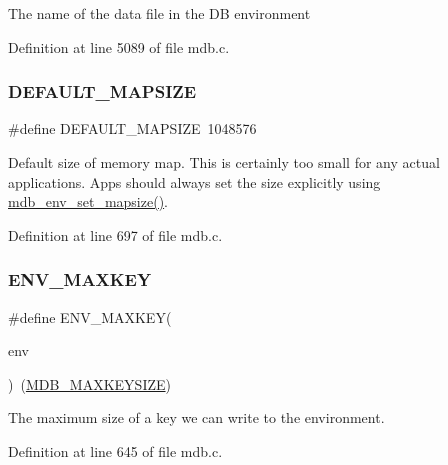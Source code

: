 The name of the data file in the DB environment 

Definition at line 5089 of file mdb.\+c.

\mbox{\label{group__internal_ga506f893519db205966f7988c03c920f5}} 
\subsubsection{\texorpdfstring{D\+E\+F\+A\+U\+L\+T\+\_\+\+M\+A\+P\+S\+I\+ZE}{DEFAULT\_MAPSIZE}}
{\footnotesize\ttfamily \#define D\+E\+F\+A\+U\+L\+T\+\_\+\+M\+A\+P\+S\+I\+ZE~1048576}

Default size of memory map. This is certainly too small for any actual applications. Apps should always set the size explicitly using \mbox{\hyperlink{group__internal_gab4fb586d631d0cfdd0a134b8c19f371b}{mdb\+\_\+env\+\_\+set\+\_\+mapsize()}}. 

Definition at line 697 of file mdb.\+c.

\mbox{\label{group__internal_ga81fe7e8b859d93e245ac73990bbeb90b}} 
\subsubsection{\texorpdfstring{E\+N\+V\+\_\+\+M\+A\+X\+K\+EY}{ENV\_MAXKEY}}
{\footnotesize\ttfamily \#define E\+N\+V\+\_\+\+M\+A\+X\+K\+EY(\begin{DoxyParamCaption}\item[{}]{env }\end{DoxyParamCaption})~(\mbox{\hyperlink{group__internal_gac929399f5d93cef85f874b9e9b1d09e0}{M\+D\+B\+\_\+\+M\+A\+X\+K\+E\+Y\+S\+I\+ZE}})}

The maximum size of a key we can write to the environment. 

Definition at line 645 of file mdb.\+c.

\mbox{\label{group__internal_gaa714d529ede8765c6f6fffe5293b3bd4}} 
